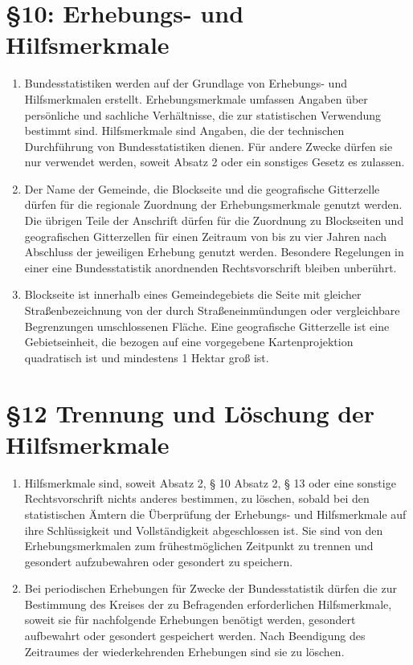 \documentclass[12pt]{scrbook}
\begin{document}
    \section{\S 10: Erhebungs- und Hilfsmerkmale}
        \begin{enumerate}[label=(\arabic*)]
            \item Bundesstatistiken werden auf der Grundlage von Erhebungs- und Hilfsmerkmalen erstellt. Erhebungsmerkmale umfassen Angaben über persönliche und sachliche Verhältnisse, die zur statistischen Verwendung bestimmt sind. Hilfsmerkmale sind Angaben, die der technischen Durchführung von Bundesstatistiken dienen. Für andere Zwecke dürfen sie nur verwendet werden, soweit Absatz 2 oder ein sonstiges Gesetz es zulassen.
            \item Der Name der Gemeinde, die Blockseite und die geografische Gitterzelle dürfen für die regionale Zuordnung der Erhebungsmerkmale genutzt werden. Die übrigen Teile der Anschrift dürfen für die Zuordnung zu Blockseiten und geografischen Gitterzellen für einen Zeitraum von bis zu vier Jahren nach Abschluss der jeweiligen Erhebung genutzt werden. Besondere Regelungen in einer eine Bundesstatistik anordnenden Rechtsvorschrift bleiben unberührt.
            \item Blockseite ist innerhalb eines Gemeindegebiets die Seite mit gleicher Straßenbezeichnung von der durch Straßeneinmündungen oder vergleichbare Begrenzungen umschlossenen Fläche. Eine geografische Gitterzelle ist eine Gebietseinheit, die bezogen auf eine vorgegebene Kartenprojektion quadratisch ist und mindestens 1 Hektar groß ist.
        \end{enumerate}
    \section{\S 12 Trennung und Löschung der Hilfsmerkmale}
        \begin{enumerate}[label=(\arabic*)]
            \item Hilfsmerkmale sind, soweit Absatz 2, § 10 Absatz 2, § 13 oder eine sonstige Rechtsvorschrift nichts anderes bestimmen, zu löschen, sobald bei den statistischen Ämtern die Überprüfung der Erhebungs- und Hilfsmerkmale auf ihre Schlüssigkeit und Vollständigkeit abgeschlossen ist. Sie sind von den Erhebungsmerkmalen zum frühestmöglichen Zeitpunkt zu trennen und gesondert aufzubewahren oder gesondert zu speichern.
            \item Bei periodischen Erhebungen für Zwecke der Bundesstatistik dürfen die zur Bestimmung des Kreises der zu Befragenden erforderlichen Hilfsmerkmale, soweit sie für nachfolgende Erhebungen benötigt werden, gesondert aufbewahrt oder gesondert gespeichert werden. Nach Beendigung des Zeitraumes der wiederkehrenden Erhebungen sind sie zu löschen.
        \end{enumerate}
\end{document}
